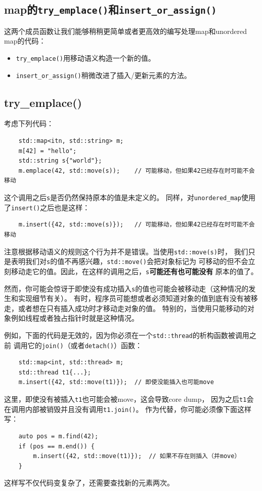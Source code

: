 \subsection{map的\texttt{try\_emplace()}和\texttt{insert\_or\_assign()}}
这两个成员函数让我们能够稍稍更简单或者更高效的编写处理map和unordered map的代码：
\begin{itemize}
    \item \texttt{try\_emplace()}用移动语义构造一个新的值。
    \item \texttt{insert\_or\_assign()}稍微改进了插入/更新元素的方法。
\end{itemize}

\subsection{try\_emplace()}
考虑下列代码：
\begin{lstlisting}
    std::map<itn, std::string> m;
    m[42] = "hello";
    std::string s{"world"};
    m.emplace(42, std::move(s));    // 可能移动，但如果42已经存在时可能不会移动
\end{lstlisting}
这个调用之后\texttt{s}是否仍然保持原本的值是未定义的。
同样，对\texttt{unordered\_map}使用了\texttt{insert()}之后也是这样：
\begin{lstlisting}
    m.insert({42, std::move(s)});   // 可能移动，但如果42已经存在时可能不会移动
\end{lstlisting}
注意根据移动语义的规则这个行为并不是错误。当使用\texttt{std::move(s)}时，
我们只是表明我们对\texttt{s}的值不再感兴趣，\texttt{std::move()}会把对象标记为
可移动的但不会立刻移动走它的值。因此，在这样的调用之后，\texttt{s}\textbf{可能还有也可能没有}
原本的值了。

然而，你可能会惊讶于即使没有成功插入\texttt{s}的值也可能会被移动走（这种情况的发生和实现细节有关）。
有时，程序员可能想或者必须知道对象的值到底有没有被移走，或者想在只有插入成功时才移动走对象的值。
特别的，当使用只能移动的对象例如线程或者独占指针时就是这种情况。

例如，下面的代码是无效的，因为你必须在一个\texttt{std::thread}的析构函数被调用之前
调用它的\texttt{join()}（或者\texttt{detach()}）函数：
\begin{lstlisting}
    std::map<int, std::thread> m;
    std::thread t1{...};
    m.insert({42, std::move(t1)});  // 即使没能插入也可能move
\end{lstlisting}
这里，即使没有被插入\texttt{t1}也可能会被move，这会导致core dump，
因为之后\texttt{t1}会在调用内部被销毁并且没有调用\texttt{t1.join()}。
作为代替，你可能必须像下面这样写：
\begin{lstlisting}
    auto pos = m.find(42);
    if (pos == m.end()) {
        m.insert({42, std::move(t1)});  // 如果不存在则插入（并move）
    }
\end{lstlisting}
这样写不仅代码变复杂了，还需要查找新的元素两次。


